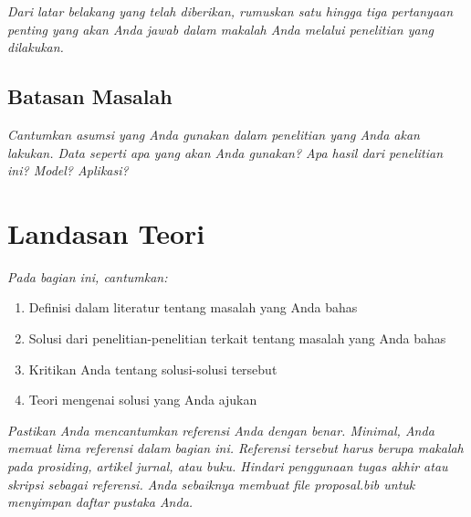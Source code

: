 \documentclass[12pt]{report}
\begin{document}
\emph{Dari latar belakang yang telah diberikan, rumuskan satu hingga tiga pertanyaan penting yang akan Anda jawab dalam makalah Anda melalui penelitian yang dilakukan.}


\section{Batasan Masalah} %
\label{sec:batasan_masalah}

\emph{Cantumkan asumsi yang Anda gunakan dalam penelitian yang Anda akan lakukan. Data seperti apa yang akan Anda gunakan? Apa hasil dari penelitian ini? Model? Aplikasi?}


\chapter{Landasan Teori}

\emph{Pada bagian ini, cantumkan:}
\begin{enumerate}
    \item Definisi dalam literatur tentang masalah yang Anda bahas
    \item Solusi dari penelitian-penelitian terkait tentang masalah yang Anda bahas
    \item Kritikan Anda tentang solusi-solusi tersebut
    \item Teori mengenai solusi yang Anda ajukan
\end{enumerate}
\emph{Pastikan Anda mencantumkan referensi Anda dengan benar. Minimal, Anda memuat lima referensi dalam bagian ini. Referensi tersebut harus berupa makalah pada prosiding, artikel jurnal, atau buku. Hindari penggunaan tugas akhir atau skripsi sebagai referensi. Anda sebaiknya membuat file proposal.bib untuk menyimpan daftar pustaka Anda.}




\end{document}
